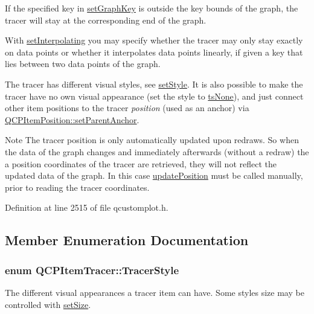 If the specified key in \hyperlink{class_q_c_p_item_tracer_a6840143b42f3b685cedf7c6d83a704c8}{set\-Graph\-Key} is outside the key bounds of the graph, the tracer will stay at the corresponding end of the graph.

With \hyperlink{class_q_c_p_item_tracer_a6c244a9d1175bef12b50afafd4f5fcd2}{set\-Interpolating} you may specify whether the tracer may only stay exactly on data points or whether it interpolates data points linearly, if given a key that lies between two data points of the graph.

The tracer has different visual styles, see \hyperlink{class_q_c_p_item_tracer_a41a2ac4f1acd7897b4e2a2579c03204e}{set\-Style}. It is also possible to make the tracer have no own visual appearance (set the style to \hyperlink{class_q_c_p_item_tracer_a2f05ddb13978036f902ca3ab47076500aac27462c79146225bfa8fba24d2ee8a4}{ts\-None}), and just connect other item positions to the tracer {\itshape position} (used as an anchor) via \hyperlink{class_q_c_p_item_position_ac094d67a95d2dceafa0d50b9db3a7e51}{Q\-C\-P\-Item\-Position\-::set\-Parent\-Anchor}.

\begin{DoxyNote}{Note}
The tracer position is only automatically updated upon redraws. So when the data of the graph changes and immediately afterwards (without a redraw) the a position coordinates of the tracer are retrieved, they will not reflect the updated data of the graph. In this case \hyperlink{class_q_c_p_item_tracer_a5b90296109e36384aedbc8908a670413}{update\-Position} must be called manually, prior to reading the tracer coordinates. 
\end{DoxyNote}


Definition at line 2515 of file qcustomplot.\-h.



\subsection{Member Enumeration Documentation}
\hypertarget{class_q_c_p_item_tracer_a2f05ddb13978036f902ca3ab47076500}{
\subsubsection[{Tracer\-Style}]{\setlength{\rightskip}{0pt plus 5cm}enum {\bf Q\-C\-P\-Item\-Tracer\-::\-Tracer\-Style}}}\label{class_q_c_p_item_tracer_a2f05ddb13978036f902ca3ab47076500}
The different visual appearances a tracer item can have. Some styles size may be controlled with \hyperlink{class_q_c_p_item_tracer_ae47fe0617f5fef5fdb766999569be10a}{set\-Size}.

